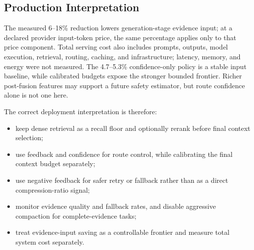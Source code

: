 \subsection{Production Interpretation}
\label{sec:07-discussion:production-interpretation}

The measured 6--18\% reduction lowers generation-stage evidence input; at a declared provider input-token price, the same percentage applies only to that price component. Total serving cost also includes prompts, outputs, model execution, retrieval, routing, caching, and infrastructure; latency, memory, and energy were not measured. The 4.7--5.3\% confidence-only policy is a stable input baseline, while calibrated budgets expose the stronger bounded frontier. Richer post-fusion features may support a future safety estimator, but route confidence alone is not one here.

The correct deployment interpretation is therefore:

\begin{itemize}
\item keep dense retrieval as a recall floor and optionally rerank before final context selection;
\item use feedback and confidence for route control, while calibrating the final context budget separately;
\item use negative feedback for safer retry or fallback rather than as a direct compression-ratio signal;
\item monitor evidence quality and fallback rates, and disable aggressive compaction for complete-evidence tasks;
\item treat evidence-input saving as a controllable frontier and measure total system cost separately.
\end{itemize}
